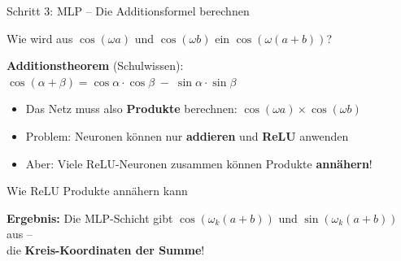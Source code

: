 \documentclass[aspectratio=169, 12pt]{beamer}
\newcommand{\stich}[1]{\item[\color{akzent}\faAngleRight] #1}
\begin{document}
\begin{frame}{Schritt 3: MLP -- Die Additionsformel berechnen}
  \begin{center}
    {\large Wie wird aus $\cos(\omega a)$ und $\cos(\omega b)$ ein $\cos(\omega(a+b))$?}
  \end{center}

  \bigskip
  \begin{center}
    \colorbox{dunkel!10}{%
      \parbox{0.85\textwidth}{\centering
        \textbf{Additionstheorem} (Schulwissen):\\[6pt]
        $\cos(\alpha + \beta) = \cos\alpha \cdot \cos\beta \;-\; \sin\alpha \cdot \sin\beta$
      }%
    }
  \end{center}

  \bigskip
  \begin{itemize}
    \stich{Das Netz muss also \textbf{Produkte} berechnen: $\cos(\omega a) \times \cos(\omega b)$}
    \stich{Problem: Neuronen k\"onnen nur \textbf{addieren} und \textbf{ReLU} anwenden}
    \stich{Aber: Viele ReLU-Neuronen zusammen k\"onnen Produkte \textbf{ann\"ahern}!}
  \end{itemize}
\end{frame}

\begin{frame}{Wie ReLU Produkte ann\"ahern kann}
  \begin{center}
  \end{center}

  \bigskip
  \begin{center}
    \colorbox{akzent!10}{%
      \parbox{0.75\textwidth}{\centering\small
        \textbf{Ergebnis:} Die MLP-Schicht gibt $\cos(\omega_k(a+b))$ und $\sin(\omega_k(a+b))$ aus --\\
        die \textbf{Kreis-Koordinaten der Summe}!
      }%
    }
  \end{center}
\end{frame}
\end{document}
